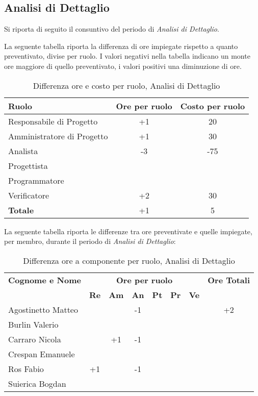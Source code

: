 \subsection{Analisi di Dettaglio}
Si riporta di seguito il consuntivo del periodo di \textit{Analisi di Dettaglio}.

\noindent La seguente tabella riporta la differenza di ore impiegate rispetto a quanto preventivato, divise per ruolo. I valori negativi nella tabella indicano un monte ore maggiore di quello preventivato, i valori positivi una diminuzione di ore.

\begin{table}[h]
	\centering
	\begin{tabular}{|l|c|c|}
		\toprule
		\textbf{Ruolo} & \textbf{Ore per ruolo} & \textbf{Costo per ruolo} \\
		
		\midrule
		Responsabile di Progetto & +1 & 20 \\
		Amministratore di Progetto & +1 & 30 \\ 
		Analista & -3 & -75 \\
		Progettista & & \\
		Programmatore & & \\
		Verificatore & +2 & 30 \\
		\midrule
		\textbf{Totale} & +1 & 5 \\
		
		\bottomrule
	\end{tabular}
	\caption{Differenza ore e costo per ruolo, Analisi di Dettaglio}
	\label{tab4}
\end{table} 

\noindent La seguente tabella riporta le differenze tra ore preventivate e quelle impiegate, per membro, durante il periodo di \textit{Analisi di Dettaglio}: 
\begin{table}[h]
	\centering
	\begin{tabular}{|l|c|c|c|c|c|c|c|}
		\toprule
		\textbf{Cognome e Nome} & \multicolumn{6}{c}{\textbf{Ore per ruolo}} & \textbf{Ore Totali} \\
		& \textbf{Re} & \textbf{Am} & \textbf{An} & \textbf{Pt} & \textbf{Pr} & \textbf{Ve} & \\
		
		\midrule
		Agostinetto Matteo & & & -1 & & & & +2 \\
		Burlin Valerio & & & & & & & \\ 
		Carraro Nicola & & +1 & -1 & & & & \\
		Crespan Emanuele & & & & & & & \\
		Ros Fabio & +1 & & -1 & & & & \\
		Suierica Bogdan & & & & & & & \\
		
		\bottomrule
	\end{tabular}
	\caption{Differenza ore a componente per ruolo, Analisi di Dettaglio}
\end{table}


